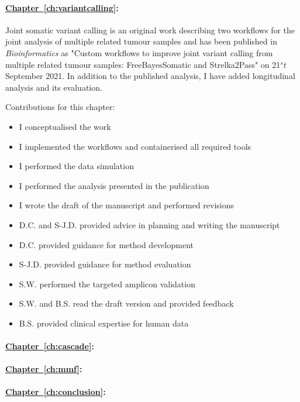 {\paragraph{\hyperref[ch:variantcalling]{Chapter~\ref*{ch:variantcalling}}:} Joint somatic variant calling is an original work describing two workflows for the joint analysis of multiple related tumour samples and has been published in \textit{Bioinformatics} as "Custom workflows to improve joint variant calling from multiple related tumour samples: FreeBayesSomatic and Strelka2Pass" on 21$^st$ September 2021. In addition to the published analysis, I have added longitudinal analysis and its evaluation.

Contributions for this chapter:
\begin{itemize}
	\item I conceptualised the work
	\item I implemented the workflows and containerised all required tools
	\item I performed the data simulation
	\item I performed the analysis presented in the publication
	\item I wrote the draft of the manuscript and performed revisions
	\item D.C. and S-J.D. provided advice in planning and writing the manuscript
	\item D.C. provided guidance for method development
	\item S-J.D. provided guidance for method evaluation
	\item S.W. performed the targeted amplicon validation
	\item S.W. and  B.S. read the draft version and provided feedback
	\item B.S. provided clinical expertise for human data
\end{itemize}



\paragraph{\hyperref[ch:cascade]{Chapter~\ref*{ch:cascade}}:} 


\paragraph{\hyperref[ch:mmf]{Chapter~\ref*{ch:mmf}}:}

\paragraph{\hyperref[ch:conclusion]{Chapter~\ref*{ch:conclusion}}:}

}
